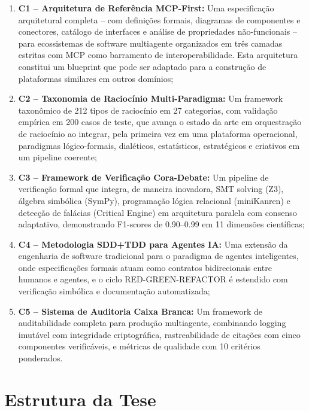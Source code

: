 \documentclass[12pt,a4paper,sumario=tradicional,openany]{abntex2}
\begin{document}
\begin{enumerate}[leftmargin=*]
    \item \textbf{C1 -- Arquitetura de Referência MCP-First:} Uma especificação arquitetural completa -- com definições formais, diagramas de componentes e conectores, catálogo de interfaces e análise de propriedades não-funcionais -- para ecossistemas de software multiagente organizados em três camadas estritas com MCP como barramento de interoperabilidade. Esta arquitetura constitui um blueprint que pode ser adaptado para a construção de plataformas similares em outros domínios;
    
    \item \textbf{C2 -- Taxonomia de Raciocínio Multi-Paradigma:} Um framework taxonômico de 212 tipos de raciocínio em 27 categorias, com validação empírica em 200 casos de teste, que avança o estado da arte em orquestração de raciocínio ao integrar, pela primeira vez em uma plataforma operacional, paradigmas lógico-formais, dialéticos, estatísticos, estratégicos e criativos em um pipeline coerente;
    
    \item \textbf{C3 -- Framework de Verificação Cora-Debate:} Um pipeline de verificação formal que integra, de maneira inovadora, SMT solving (Z3), álgebra simbólica (SymPy), programação lógica relacional (miniKanren) e detecção de falácias (Critical Engine) em arquitetura paralela com consenso adaptativo, demonstrando F1-scores de 0.90--0.99 em 11 dimensões científicas;
    
    \item \textbf{C4 -- Metodologia SDD+TDD para Agentes IA:} Uma extensão da engenharia de software tradicional para o paradigma de agentes inteligentes, onde especificações formais atuam como contratos bidirecionais entre humanos e agentes, e o ciclo RED-GREEN-REFACTOR é estendido com verificação simbólica e documentação automatizada;
    
    \item \textbf{C5 -- Sistema de Auditoria Caixa Branca:} Um framework de auditabilidade completa para produção multiagente, combinando logging imutável com integridade criptográfica, rastreabilidade de citações com cinco componentes verificáveis, e métricas de qualidade com 10 critérios ponderados.
\end{enumerate}

\section{Estrutura da Tese}
\end{document}
